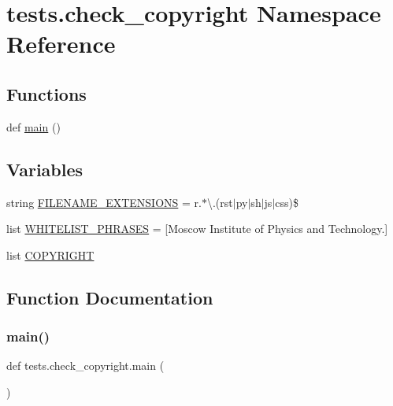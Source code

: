\hypertarget{namespacetests_1_1check__copyright}{}\section{tests.\+check\+\_\+copyright Namespace Reference}
\label{namespacetests_1_1check__copyright}
\subsection*{Functions}
\begin{DoxyCompactItemize}
\item 
def \hyperlink{namespacetests_1_1check__copyright_a9fcf3c755e0bf8e93320f2f09bd7ce04}{main} ()
\end{DoxyCompactItemize}
\subsection*{Variables}
\begin{DoxyCompactItemize}
\item 
string \hyperlink{namespacetests_1_1check__copyright_a02d576b9d1c70c74e9e84b01ba302b98}{F\+I\+L\+E\+N\+A\+M\+E\+\_\+\+E\+X\+T\+E\+N\+S\+I\+O\+NS} = r\textquotesingle{}.$\ast$\textbackslash{}.(rst$\vert$py$\vert$sh$\vert$js$\vert$css)\$\textquotesingle{}
\item 
list \hyperlink{namespacetests_1_1check__copyright_aa028229874e3e02254571da6a248a559}{W\+H\+I\+T\+E\+L\+I\+S\+T\+\_\+\+P\+H\+R\+A\+S\+ES} = \mbox{[}\textquotesingle{}Moscow Institute of Physics and Technology.\textquotesingle{}\mbox{]}
\item 
list \hyperlink{namespacetests_1_1check__copyright_a361e718fc8069f0dbaba196f07909b93}{C\+O\+P\+Y\+R\+I\+G\+HT}
\end{DoxyCompactItemize}


\subsection{Function Documentation}
\mbox{\label{namespacetests_1_1check__copyright_a9fcf3c755e0bf8e93320f2f09bd7ce04}} 
\subsubsection{\texorpdfstring{main()}{main()}}
{\footnotesize\ttfamily def tests.\+check\+\_\+copyright.\+main (\begin{DoxyParamCaption}{ }\end{DoxyParamCaption})}



